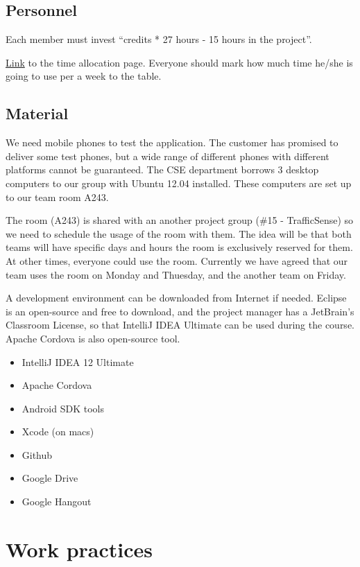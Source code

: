 \subsection{Personnel}

Each member must invest ``credits * 27 hours - 15 hours in the project''.

\href{https://docs.google.com/spreadsheet/ccc?key=0Ahu59q_GwtcedHI3MnJQM0NWZS11a
GxFTzFZeVEyQVE&usp=sharing}{Link} to the time allocation page. Everyone should 
mark how much time he/she is going to use per a week to the table.

\subsection{Material}

We need mobile phones to test the application. The customer has promised to 
deliver some test phones, but a wide range of different phones with different 
platforms cannot be guaranteed. The CSE department borrows 3 desktop computers 
to our group with Ubuntu 12.04 installed. These computers are set up 
to our team room A243.

The room (A243) is shared with an another project group (\#15 -  TrafficSense)
so we need to schedule the usage of the room with them. The idea  will be that
both teams will have specific days and hours the room is  exclusively reserved
for them. At other times, everyone could use the room. Currently we have
agreed that our team uses the room on Monday and Thuesday, and the another
team on Friday.

A development environment can be downloaded from Internet if needed. Eclipse is 
an open-source and free to download, and the project manager has a JetBrain's 
Classroom License, so that IntelliJ IDEA Ultimate can be used during the course. Apache Cordova is also open-source tool.

\begin{itemize}
\item IntelliJ IDEA 12 Ultimate
\item Apache Cordova
\item Android SDK tools
\item Xcode (on macs)
\item Github
\item Google Drive
\item Google Hangout
\end{itemize}


\section{Work practices}

